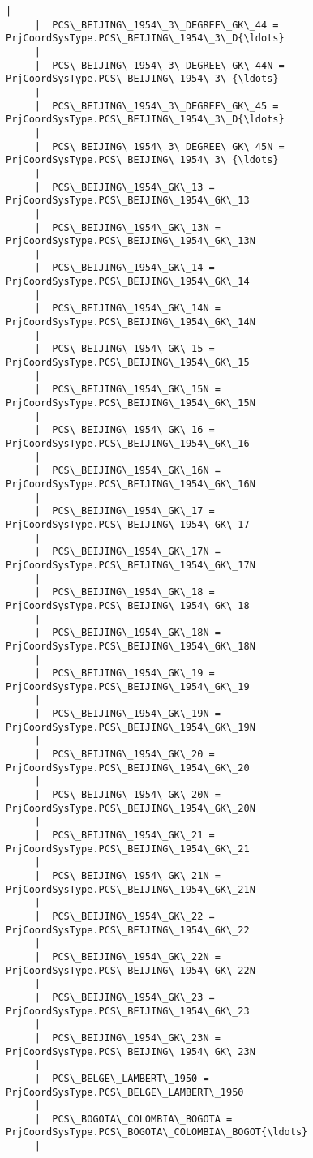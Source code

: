 \documentclass[11pt]{article}
\begin{document}
\begin{Verbatim}[commandchars=\\\{\}]
     |  
     |  PCS\_BEIJING\_1954\_3\_DEGREE\_GK\_44 = PrjCoordSysType.PCS\_BEIJING\_1954\_3\_D{\ldots}
     |  
     |  PCS\_BEIJING\_1954\_3\_DEGREE\_GK\_44N = PrjCoordSysType.PCS\_BEIJING\_1954\_3\_{\ldots}
     |  
     |  PCS\_BEIJING\_1954\_3\_DEGREE\_GK\_45 = PrjCoordSysType.PCS\_BEIJING\_1954\_3\_D{\ldots}
     |  
     |  PCS\_BEIJING\_1954\_3\_DEGREE\_GK\_45N = PrjCoordSysType.PCS\_BEIJING\_1954\_3\_{\ldots}
     |  
     |  PCS\_BEIJING\_1954\_GK\_13 = PrjCoordSysType.PCS\_BEIJING\_1954\_GK\_13
     |  
     |  PCS\_BEIJING\_1954\_GK\_13N = PrjCoordSysType.PCS\_BEIJING\_1954\_GK\_13N
     |  
     |  PCS\_BEIJING\_1954\_GK\_14 = PrjCoordSysType.PCS\_BEIJING\_1954\_GK\_14
     |  
     |  PCS\_BEIJING\_1954\_GK\_14N = PrjCoordSysType.PCS\_BEIJING\_1954\_GK\_14N
     |  
     |  PCS\_BEIJING\_1954\_GK\_15 = PrjCoordSysType.PCS\_BEIJING\_1954\_GK\_15
     |  
     |  PCS\_BEIJING\_1954\_GK\_15N = PrjCoordSysType.PCS\_BEIJING\_1954\_GK\_15N
     |  
     |  PCS\_BEIJING\_1954\_GK\_16 = PrjCoordSysType.PCS\_BEIJING\_1954\_GK\_16
     |  
     |  PCS\_BEIJING\_1954\_GK\_16N = PrjCoordSysType.PCS\_BEIJING\_1954\_GK\_16N
     |  
     |  PCS\_BEIJING\_1954\_GK\_17 = PrjCoordSysType.PCS\_BEIJING\_1954\_GK\_17
     |  
     |  PCS\_BEIJING\_1954\_GK\_17N = PrjCoordSysType.PCS\_BEIJING\_1954\_GK\_17N
     |  
     |  PCS\_BEIJING\_1954\_GK\_18 = PrjCoordSysType.PCS\_BEIJING\_1954\_GK\_18
     |  
     |  PCS\_BEIJING\_1954\_GK\_18N = PrjCoordSysType.PCS\_BEIJING\_1954\_GK\_18N
     |  
     |  PCS\_BEIJING\_1954\_GK\_19 = PrjCoordSysType.PCS\_BEIJING\_1954\_GK\_19
     |  
     |  PCS\_BEIJING\_1954\_GK\_19N = PrjCoordSysType.PCS\_BEIJING\_1954\_GK\_19N
     |  
     |  PCS\_BEIJING\_1954\_GK\_20 = PrjCoordSysType.PCS\_BEIJING\_1954\_GK\_20
     |  
     |  PCS\_BEIJING\_1954\_GK\_20N = PrjCoordSysType.PCS\_BEIJING\_1954\_GK\_20N
     |  
     |  PCS\_BEIJING\_1954\_GK\_21 = PrjCoordSysType.PCS\_BEIJING\_1954\_GK\_21
     |  
     |  PCS\_BEIJING\_1954\_GK\_21N = PrjCoordSysType.PCS\_BEIJING\_1954\_GK\_21N
     |  
     |  PCS\_BEIJING\_1954\_GK\_22 = PrjCoordSysType.PCS\_BEIJING\_1954\_GK\_22
     |  
     |  PCS\_BEIJING\_1954\_GK\_22N = PrjCoordSysType.PCS\_BEIJING\_1954\_GK\_22N
     |  
     |  PCS\_BEIJING\_1954\_GK\_23 = PrjCoordSysType.PCS\_BEIJING\_1954\_GK\_23
     |  
     |  PCS\_BEIJING\_1954\_GK\_23N = PrjCoordSysType.PCS\_BEIJING\_1954\_GK\_23N
     |  
     |  PCS\_BELGE\_LAMBERT\_1950 = PrjCoordSysType.PCS\_BELGE\_LAMBERT\_1950
     |  
     |  PCS\_BOGOTA\_COLOMBIA\_BOGOTA = PrjCoordSysType.PCS\_BOGOTA\_COLOMBIA\_BOGOT{\ldots}
     |  

\end{Verbatim}
\end{document}
